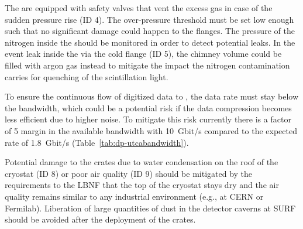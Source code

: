 The  are equipped with safety valves that vent the excess gas in case of the sudden pressure rise (ID 4). The over-pressure threshold must be set low enough such that no significant damage could happen to the flanges. The pressure of the nitrogen inside the  should be monitored in order to detect potential leaks. In the event leak inside the  via the cold flange (ID 5), the chimney volume could be filled with argon gas instead to mitigate the impact the nitrogen contamination carries for quenching of the scintillation light.  

To ensure the continuous flow of digitized data to , the data rate must stay below the  bandwidth, which could be a potential risk if the data compression becomes less efficient due to higher noise. To mitigate this risk currently there is a factor of \num{5} margin in the available bandwidth with \SI{10}{Gbit/s}  compared to the expected rate of \SI{1.8}{Gbit/s} (Table~\ref{tab:dp-utcabandwidth}).

Potential damage to the  crates due to water condensation on the roof of the cryostat (ID 8) or poor air quality (ID 9) should be mitigated by the requirements to the LBNF that the top of the cryostat stays dry and the air quality remains similar to any industrial environment (e.g., at CERN or Fermilab). Liberation of large quantities of dust in the detector caverns at SURF should be avoided after the deployment of the  crates.
